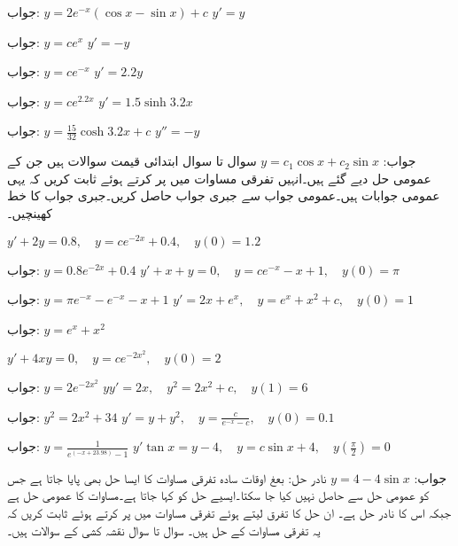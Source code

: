 جواب:\quad
 $y=2e^{-x}(\cos x-\sin x)+c$
\quad
$y'=y$

جواب:\quad
$y=ce^{x}$
\quad
$y'=-y$

جواب:\quad
$y=ce^{-x}$
\quad
$y'=2.2y$

جواب:\quad
$y=ce^{2.2x}$
\quad
$y'=1.5\sinh 3.2x$

جواب:\quad
$y=\tfrac{15}{32}\cosh 3.2x+c$
\quad
$y''=-y$

جواب:\quad
$y=c_1\cos x+c_2\sin x$
سوال  تا سوال  ابتدائی قیمت سوالات ہیں جن کے عمومی حل دیے گئے ہیں۔انہیں تفرقی مساوات میں پر کرتے ہوئے ثابت کریں کہ یہی عمومی جوابات ہیں۔عمومی جواب سے جبری جواب حاصل کریں۔جبری جواب کا خط کھینچیں۔

\quad
$y'+2y=0.8,\quad y=ce^{-2x}+0.4,\quad y(0)=1.2$

جواب:\quad
$y=0.8e^{-2x}+0.4$
\quad
$y'+x+y=0,\quad y=ce^{-x}-x+1,\quad y(0)=\pi$

جواب:\quad
$y=\pi e^{-x}-e^{-x}-x+1$
\quad
$y'=2x+e^{x},\quad y=e^{x}+x^2+c,\quad y(0)=1$

جواب:\quad
$y=e^{x}+x^2$


\quad
$y'+4xy=0,\quad y=ce^{-2x^2},\quad y(0)=2$

جواب:\quad
$y=2e^{-2x^2}$
\quad
$yy'=2x,\quad y^2=2x^2+c,\quad y(1)=6$

جواب:\quad
$y^2=2x^2+34$
\quad
$y'=y+y^2,\quad y=\tfrac{c}{e^{-x}-c},\quad y(0)=0.1$

جواب:\quad
$y=\tfrac{1}{e^{(-x+23.98)}-1}$
\quad
$y'\tan x=y-4,\quad y=c\sin x+4,\quad y(\tfrac{\pi}{2})=0$

جواب:\quad
$y=4-4\sin x$
نادر حل: بعغ اوقات سادہ تفرقی مساوات کا ایسا حل بھی پایا جاتا ہے جس کو عمومی حل سے حاصل نہیں کیا جا سکتا۔ایسیے حل کو  کہا جاتا ہے۔مساوات  کا عمومی حل  ہے جبکہ اس کا  نادر حل  ہے۔ ان حل کا تفرق لیتے ہوئے تفرقی مساوات میں پر کرتے ہوئے ثابت کریں کہ یہ تفرقی مساوات کے حل ہیں۔
سوال  تا سوال  نقشہ کشی کے سوالات ہیں۔

